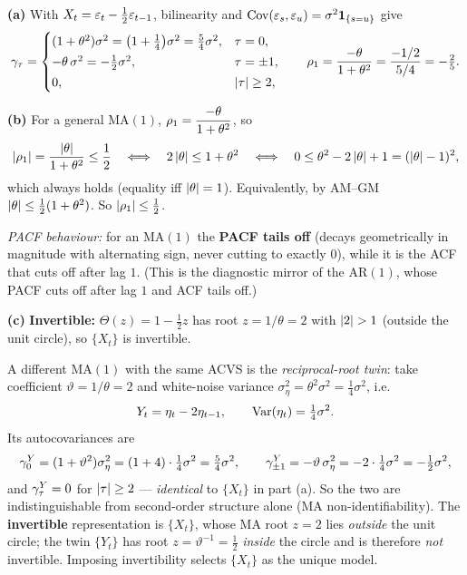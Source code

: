 \documentclass[11pt]{article}
\begin{document}
\textbf{(a)} With $X_t=\varepsilon_t-\tfrac12\varepsilon_{t-1}$, bilinearity and $\operatorname{Cov}(\varepsilon_s,\varepsilon_u)=\sigma^2\mathbf{1}_{\{s=u\}}$ give
\[
\gamma_\tau=\begin{cases}
(1+\theta^2)\sigma^2=\big(1+\tfrac14\big)\sigma^2=\tfrac54\sigma^2,&\tau=0,\\[2pt]
-\theta\,\sigma^2=-\tfrac12\sigma^2,&\tau=\pm1,\\[2pt]
0,&\left\lvert \tau \right\rvert\ge2,
\end{cases}
\qquad
\rho_1=\frac{-\theta}{1+\theta^2}=\frac{-1/2}{5/4}=-\tfrac25 .
\]

\textbf{(b)} For a general $\mathrm{MA}(1)$, $\rho_1=\dfrac{-\theta}{1+\theta^2}$, so
\[
\left\lvert \rho_1 \right\rvert=\frac{\left\lvert \theta \right\rvert}{1+\theta^2}\le\frac12
\quad\Longleftrightarrow\quad
2\left\lvert \theta \right\rvert\le 1+\theta^2
\quad\Longleftrightarrow\quad
0\le\theta^2-2\left\lvert \theta \right\rvert+1=(\left\lvert \theta \right\rvert-1)^2,
\]
which always holds (equality iff $\left\lvert \theta \right\rvert=1$). Equivalently, by AM--GM $\left\lvert \theta \right\rvert\le\tfrac12(1+\theta^2)$. So $\left\lvert \rho_1 \right\rvert\le\tfrac12$.

\emph{PACF behaviour:} for an $\mathrm{MA}(1)$ the \textbf{PACF tails off} (decays geometrically in magnitude with alternating sign, never cutting to exactly $0$), while it is the ACF that cuts off after lag $1$. (This is the diagnostic mirror of the $\mathrm{AR}(1)$, whose PACF cuts off after lag $1$ and ACF tails off.)

\textbf{(c)} \textbf{Invertible:} $\Theta(z)=1-\tfrac12 z$ has root $z=1/\theta=2$ with $\left\lvert 2 \right\rvert>1$ (outside the unit circle), so $\{X_t\}$ is invertible.

A different $\mathrm{MA}(1)$ with the same ACVS is the \emph{reciprocal-root twin}: take coefficient $\vartheta=1/\theta=2$ and white-noise variance $\sigma_\eta^2=\theta^2\sigma^2=\tfrac14\sigma^2$, i.e.
\[
Y_t=\eta_t-2\eta_{t-1},\qquad \operatorname{Var}(\eta_t)=\tfrac14\sigma^2 .
\]
Its autocovariances are
\[
\gamma^Y_0=(1+\vartheta^2)\sigma_\eta^2=(1+4)\cdot\tfrac14\sigma^2=\tfrac54\sigma^2,
\qquad
\gamma^Y_{\pm1}=-\vartheta\,\sigma_\eta^2=-2\cdot\tfrac14\sigma^2=-\tfrac12\sigma^2,
\]
and $\gamma^Y_\tau=0$ for $\left\lvert \tau \right\rvert\ge2$ --- \emph{identical} to $\{X_t\}$ in part (a). So the two are indistinguishable from second-order structure alone (MA non-identifiability). The \textbf{invertible} representation is $\{X_t\}$, whose MA root $z=2$ lies \emph{outside} the unit circle; the twin $\{Y_t\}$ has root $z=\vartheta^{-1}=\tfrac12$ \emph{inside} the circle and is therefore \emph{not} invertible. Imposing invertibility selects $\{X_t\}$ as the unique model.
\end{document}
